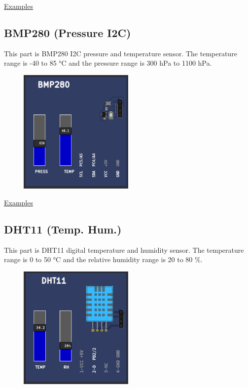 \href{https://lcgamboa.github.io/picsimlab_examples/parts_BMP180_(Pressure_I2C).html}{Examples}

\subsection{BMP280 (Pressure I2C)} 

This part is BMP280 I2C pressure and temperature sensor. 
The temperature  range is -40 to 85 °C  
and the pressure range is 300 hPa to 1100 hPa.

\begin{figure}[H]
\center
\includegraphics[width=0.5\textwidth]{img/part_bmp280.png} 
\end{figure} 


\href{https://lcgamboa.github.io/picsimlab_examples/parts_BMP280_(Pressure_I2C).html}{Examples}


\subsection{DHT11 (Temp. Hum.)} 

This part is DHT11 digital temperature and humidity sensor. The temperature  range is 0 to 50 °C  
and the relative humidity range is 20 to 80 \%.

\begin{figure}[H]
\center
\includegraphics[width=0.5\textwidth]{img/part_dht11.png} 
\end{figure} 


